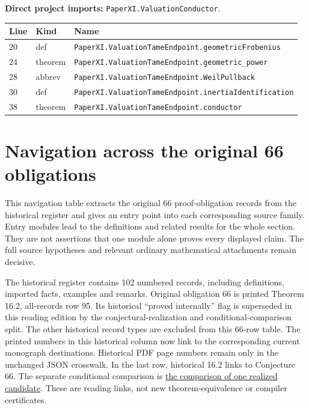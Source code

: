 \documentclass[10pt,oneside]{book}
\begin{document}
\textbf{Direct project imports:} \nolinkurl{PaperXI.ValuationConductor}.

\begin{longtable}{@{}p{}p{}p{}@{}}\toprule Line&Kind&Name\\\midrule\endhead

20&def&\nolinkurl{PaperXI.ValuationTameEndpoint.geometricFrobenius}\\

24&theorem&\nolinkurl{PaperXI.ValuationTameEndpoint.geometric_power}\\

28&abbrev&\nolinkurl{PaperXI.ValuationTameEndpoint.WeilPullback}\\

30&def&\nolinkurl{PaperXI.ValuationTameEndpoint.inertiaIdentification}\\

38&theorem&\nolinkurl{PaperXI.ValuationTameEndpoint.conductor}\\

\bottomrule\end{longtable}

\chapter{Navigation across the original 66 obligations}

This navigation table extracts the original 66 proof-obligation records from the historical register and gives an entry point into each corresponding source family. Entry modules lead to the definitions and related results for the whole section. They are not assertions that one module alone proves every displayed claim. The full source hypotheses and relevant ordinary mathematical attachments remain decisive.

The historical register contains 102 numbered records, including definitions, imported facts, examples and remarks. Original obligation 66 is printed Theorem 16.2, all-records row 95. Its historical ``proved internally'' flag is superseded in this reading edition by the conjectural-realization and conditional-comparison split. The other historical record types are excluded from this 66-row table. The printed numbers in this historical column now link to the corresponding current monograph destinations. Historical PDF page numbers remain only in the unchanged JSON crosswalk. In the last row, historical 16.2 links to Conjecture 66. The separate conditional comparison is \href{https://komorebi.invalid/b06/current_comparison}{the comparison of one realized candidate}. These are reading links, not new theorem-equivalence or compiler certificates.
\end{document}
